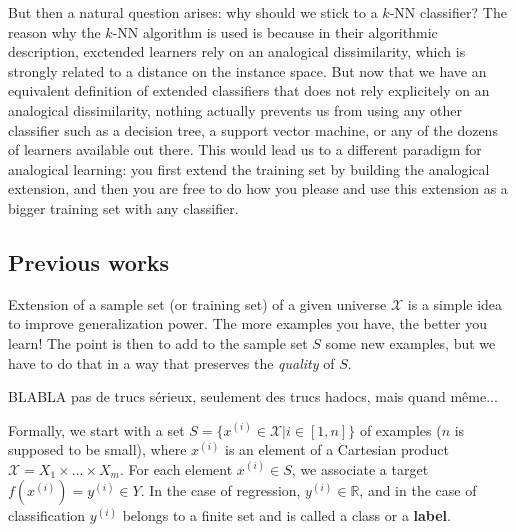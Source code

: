 But then a natural question arises: why should we stick to a $k$-NN classifier?
The reason why the $k$-NN algorithm is used is because in their algorithmic
description, exctended learners rely on an analogical dissimilarity, which is
strongly related to a distance on the instance space. But now that we have an
equivalent definition of extended classifiers that does not rely explicitely on
an analogical dissimilarity, nothing actually prevents us from using any other
classifier such as a decision tree, a support vector machine, or any of the
dozens of learners available out there. This would lead us to a different
paradigm for analogical learning: you first extend the training set by building
the analogical extension, and then you are free to do how you please and use
this extension as a bigger training set with any classifier.

\subsection{Previous works}

Extension of a sample set (or training set) of a given universe $\mathcal{X}$
is a simple idea to improve generalization power. The more examples you have,
the better you learn! The point is then to add to the sample set $S$ some new
examples, but we have to do that in a way that preserves the \textit{quality}
of $S$.

BLABLA pas de trucs sérieux, seulement des trucs hadocs, mais quand même...

Formally, we start with a set $S= \{x^{(i)} \in \mathcal{X}| i \in [1,n]\}$ of
examples ($n$ is supposed to be small), where $x^{(i)}$ is an element of a
Cartesian product $\mathcal{X} = X_1 \times \ldots \times X_m$.  For each
element  $x^{(i)} \in S$, we associate a target  $f(x^{(i)})=y^{(i)} \in Y$.
In the case of regression, $y^{(i)} \in \mathbb{R}$, and in the case of
classification $y^{(i)}$ belongs to a finite set and is called a class or a
\textbf{label}.


